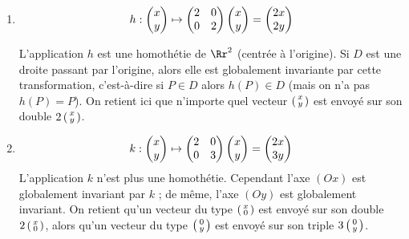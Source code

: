 \documentclass[11pt, class=report,crop=false]{standalone}
\begin{document}
\begin{enumerate}
  \item $$h  : \begin{pmatrix}x\cr y\end{pmatrix} 
\mapsto \begin{pmatrix}2&0\cr0&2\end{pmatrix} \begin{pmatrix}x\cr y\end{pmatrix}
= \begin{pmatrix}2x\cr 2y\end{pmatrix}$$

L'application $h$ est une homothétie de $\Rr^2$ (centrée à l'origine). Si $D$ est une droite passant par l'origine, alors elle est globalement invariante par cette transformation, c'est-à-dire si
$P \in D$ alors $h(P) \in D$ (mais on n'a pas $h(P)=P$). 
On retient ici que n'importe quel vecteur $\left(\begin{smallmatrix}x\cr y\end{smallmatrix}\right)$ est envoyé sur son double $2\left(\begin{smallmatrix}x\cr y\end{smallmatrix}\right)$.

  \item $$k  : \begin{pmatrix}x\cr y\end{pmatrix} 
\mapsto \begin{pmatrix}2&0\cr0&3\end{pmatrix} \begin{pmatrix}x\cr y\end{pmatrix}
= \begin{pmatrix}2x\cr 3y\end{pmatrix}$$
L'application $k$ n'est plus une homothétie. Cependant l'axe $(Ox)$ est globalement invariant par $k$ ; 
de même, l'axe $(Oy)$ est globalement invariant.
On retient qu'un vecteur du type $\left(\begin{smallmatrix}x\cr 0\end{smallmatrix}\right)$ est envoyé sur son double $2\left(\begin{smallmatrix}x\cr 0\end{smallmatrix}\right)$, alors qu'un vecteur du type $\left(\begin{smallmatrix}0\cr y\end{smallmatrix}\right)$ est envoyé sur son triple $3\left(\begin{smallmatrix}0\cr y\end{smallmatrix}\right)$.
\end{enumerate}
\end{document}
